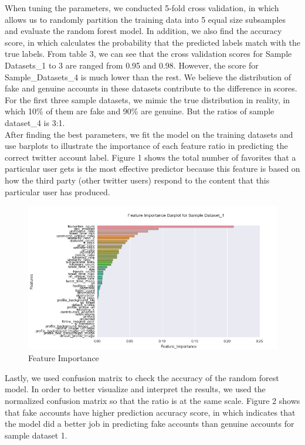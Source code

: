 \documentclass[a4paper, twoside, 12pt]{report}
\begin{document}
\noindent When tuning the parameters, we conducted 5-fold cross validation, in which allows us to randomly partition the training data into 5 equal size subsamples and evaluate the random forest model. In addition, we also find the accuracy score, in which calculates the probability that the predicted labels match with the true labels. From table 3, we can see that the cross validation scores for Sample Datasets\_1 to 3 are ranged from 0.95 and 0.98. However, the score for Sample\_Datasets\_4 is much lower than the rest. We believe the distribution of fake and genuine accounts in these datasets contribute to the difference in scores. For the first three sample datasets, we mimic the true distribution in reality, in which 10\% of them are fake and 90\% are genuine. But the ratios of sample dataset\_4 is 3:1. \\

\noindent After finding the best parameters, we fit the model on the training datasets and use barplots to illustrate the importance of each feature ratio in predicting the correct twitter account label. Figure 1 shows the total number of favorites that a particular user gets is the most effective predictor because this feature is based on how the third party (other twitter users) respond to the content that this particular user has produced.\\

\begin{figure}[H]
	\centering
	\includegraphics[scale=0.7]{feature_1}
	\caption{Feature Importance}
	\label{fig:mesh1}
\end{figure}



\noindent Lastly, we used confusion matrix to check the accuracy of the random forest model. In order to better visualize and interpret the results, we used the normalized confusion matrix so that the ratio is at the same scale. Figure 2 shows that fake accounts have higher prediction accuracy score, in which indicates that the model did a better job in predicting fake accounts than genuine accounts for sample dataset 1. 
\end{document}
